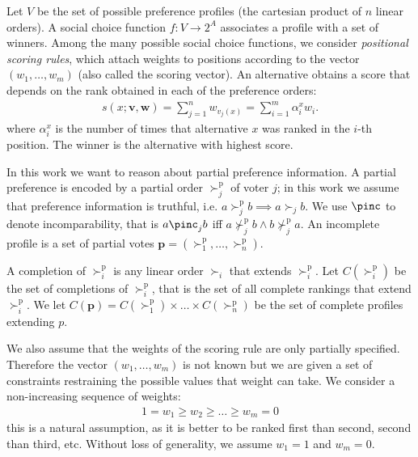 \documentclass[12pt]{article}
\newcommand{\pref}{\succ}%
\newcommand{\ppref}{\succ^\text{p}}%
\newcommand{\nppref}{\nsucc^\text{p}}%
\newcommand{\profile}{\textbf{v}}%
\newcommand{\w}{\textbf{w}}%
\begin{document}
Let $V$ be the set of possible preference profiles (the cartesian product of $n$ linear orders).
A social choice function $f : V \rightarrow 2^A$ associates a profile with a set of winners.
Among the many possible social choice functions, we consider {\em positional scoring rules}, which attach weights to positions according to  the vector $(w_1,\ldots,w_m)$ (also called the scoring vector).
An alternative obtains a score that depends on the rank obtained in each of the preference orders:
\begin{align}
s(x; \profile, \w) = \sum_{j=1}^{n} w_{v_j(x)}
= \sum_{i=1}^{m} \alpha^{x}_i w_i . \label{eq:srule}
\end{align}
where $\alpha^{x}_i$ is the number of times that alternative $x$ was ranked in the $i$-th position.
The winner is the alternative with highest score.

In this work we want to reason about partial preference information.
A partial preference  is encoded by a partial order $\ppref_j$  of voter $j$; in this work we assume that preference information is truthful, i.e. $a \ppref_j b \implies a \pref_j b$.
We use $\pinc$ to denote incomparability, that is $a \pinc_{j} b$ iff $a \nppref_j b \wedge b \nppref_j a$.
An incomplete profile is a set of partial votes  $\textbf{p}=(\ppref_1,\ldots,\ppref_n)$.

A completion of $\ppref_i$ is any linear order $\pref_i$ that extends $\ppref_i$.
Let $C(\ppref_i)$ be the set of completions of $\ppref_i$, that is the set of all complete rankings that extend $\ppref_i$.
We let $C(\textbf{p})=C(\ppref_1)\times \ldots \times C(\ppref_n)$ be the set of complete profiles extending $p$.

\medskip
We also assume that the weights of the scoring rule are only partially specified.
Therefore the vector $(w_1,\ldots,w_m)$  is not known but we are given a set of constraints restraining the possible values that weight can take.
We consider a non-increasing sequence of weights:
\begin{align}
1=w_{1} \geq w_{2} \geq \ldots \geq w_{m}=0 \label{eq:monotone}
\end{align}
this is a natural assumption, as it is better to be ranked first than second, second than third, etc. 
Without loss of generality, we assume $w_1=1$ and $w_m=0$.
\end{document}
